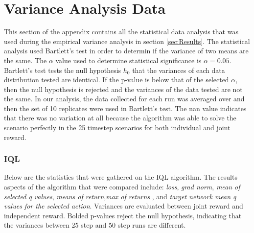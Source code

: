 \documentclass[systems,article,submit,pdftex,moreauthors]{Definitions/mdpi}
\begin{document}




\newpage
\section{Variance Analysis Data}
This section of the appendix contains all the statistical data analysis that was used during the empirical variance analysis in section \ref{sec:Results}. The statistical analysis used Bartlett's test in order to determin if the variance of two means are the same. The $\alpha$ value used to determine statistical significance is $\alpha = 0.05$. Bartlett's test tests the null hypothesis $h_0$ that the variances of each data distribution tested are identical. If the p-value is below that of the selected $\alpha$, then the null hypothesis is rejected and the variances of the data tested are not the same. 
In our analysis, the data collected for each run was averaged over and then the set of 10 replicates were used in Bartlett's test. 
The nan value indicates that there was no variation at all because the algorithm was able to solve the scenario perfectly in the 25 timestep scenarios for both individual and joint reward.

\subsubsection*{IQL}
Below are the statistics that were gathered on the IQL algorithm. The results aspects of the algorithm that were compared include: \textit{loss}, \textit{grad norm}, \textit{mean of selected q values}, \textit{means of return},\textit{max of returns} , and \textit{target network mean q values for the selected action}. 
Variances are evaluated between joint reward and independent reward. Bolded p-values reject the null hypothesis, indicating that the variances between 25 step and 50 step runs are different.
\end{document}

